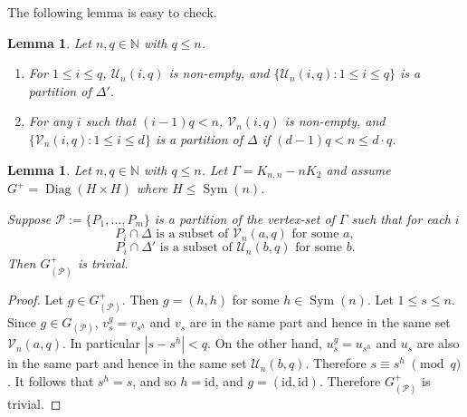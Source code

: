 \documentclass[11pt]{amsart}
\newtheorem{lemma}[theorem]{Lemma}
\DeclareMathOperator{\Sym}{Sym}
\DeclareMathOperator{\Diag}{Diag}
\newcommand{\N}{\mathbb{N}}
\begin{document}
The following lemma is easy to check.

\begin{lemma}
\label{V is partition}
Let \(n,q \in \N\) with $q\leqslant n$.
\begin{enumerate}
    \item[(a)] For $1\leqslant i\leqslant q$, $\mathcal{U}_n(i,q)$ is non-empty, and \(
    \{\mathcal{U}_n(i, q) : 1 \leqslant i \leqslant q\}
\)
is a partition of $\Delta'$.
\item[(b)]  For any $i$ such that \((i-1)q < n\), $\mathcal{V}_n(i,q)$ is non-empty, and 
\(
    \{\mathcal{V}_n(i, q) : 1 \leqslant i \leqslant d\}
\)
is a partition of $\Delta$ if \((d-1)q<n\leqslant d \cdot q \).
\end{enumerate}
\end{lemma}

\begin{lemma}\label{lem:partsaresubsets}  Let \(n,q \in \N\) with $q\leqslant n$. Let $\Gamma=K_{n,n}-nK_2$ and assume  $G^+= \Diag(H\times H)$ where $H\leq\Sym(n)$. 

Suppose \(\mathcal{P}:=\{P_{1},\ldots, P_{m}\}\) is a partition of the vertex-set of $\Gamma$ %
such that for each $i$
\[P_i\cap\Delta\text{ is a subset of }\mathcal{V}_n(a, q)\text{ for some }a, \]
\[P_i\cap\Delta'\text{ is a subset of }\mathcal{U}_n(b, q)\text{ for some }b. \]
Then $G^+_{(\mathcal{P})}$ is trivial.    
\end{lemma}
\begin{proof}
Let $g\in G^+_{(\mathcal{P})}$.
Then $g=(h,h)$ for some $h\in \Sym(n)$. 
  Let $1\leqslant s\leqslant n$.  Since \(g\in G_{(\mathcal{P})}\), $v_s^g=v_{s^h}$ and $v_s$ are in the same part and hence in the same set $\mathcal{V}_n(a, q)$. In particular $ |s-s^h|<q$. On the other hand, $u_s^g=u_{s^h}$ and $u_s$ are also in the same part and hence in the same set $\mathcal{U}_n(b, q)$. Therefore $s\equiv s^h \;\pmod q$. It follows that $s^h=s$, and so $h=\mathrm{id}$, and  $g=(\mathrm{id},\mathrm{id}).$
  Therefore $G^+_{(\mathcal{P})}$ is trivial.   
  \end{proof}

\end{document}

